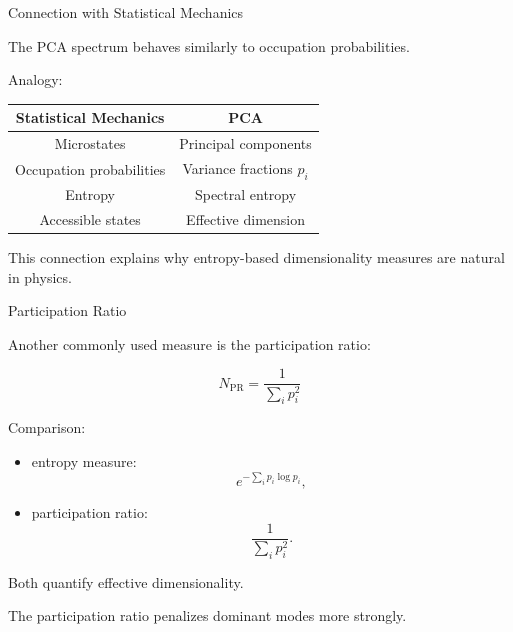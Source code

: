 \documentclass{beamer}
\begin{document}
\begin{frame}{Connection with Statistical Mechanics}

The PCA spectrum behaves similarly to occupation probabilities.

\vspace{0.4cm}

Analogy:

\begin{center}
\begin{tabular}{cc}
\toprule
Statistical Mechanics & PCA \\
\midrule
Microstates & Principal components \\
Occupation probabilities & Variance fractions $p_i$ \\
Entropy & Spectral entropy \\
Accessible states & Effective dimension \\
\bottomrule
\end{tabular}
\end{center}

\vspace{0.5cm}

This connection explains why entropy-based dimensionality measures are natural in physics.

\end{frame}

\begin{frame}{Participation Ratio}

Another commonly used measure is the participation ratio:

\[
N_{\mathrm{PR}} = \frac{1}{\sum_i p_i^2}
\]

\vspace{0.5cm}

Comparison:

\begin{itemize}
    \item entropy measure:
    \[
    e^{-\sum_i p_i\log p_i},
    \]
    
    \item participation ratio:
    \[
    \frac{1}{\sum_i p_i^2}.
    \]
\end{itemize}

\vspace{0.4cm}

Both quantify effective dimensionality.

\vspace{0.3cm}

The participation ratio penalizes dominant modes more strongly.

\end{frame}
\end{document}
